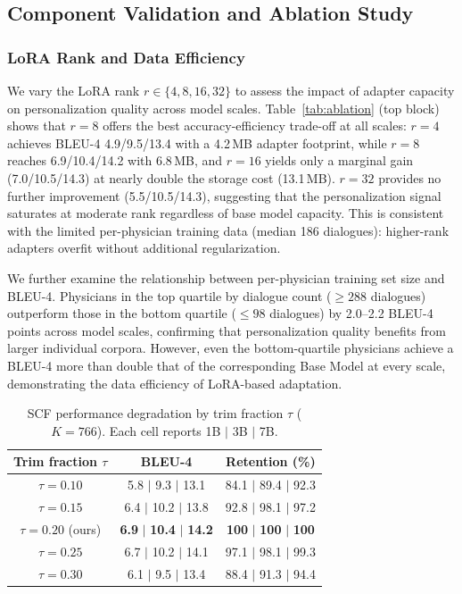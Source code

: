 \subsection{Component Validation and Ablation Study}

\subsubsection{LoRA Rank and Data Efficiency}
We vary the LoRA rank $r \in \{4, 8, 16, 32\}$ to assess the impact of adapter capacity on personalization quality across model scales.
Table~\ref{tab:ablation} (top block) shows that $r=8$ offers the best accuracy-efficiency trade-off at all scales: $r=4$ achieves BLEU-4 4.9/9.5/13.4 with a 4.2\,MB adapter footprint, while $r=8$ reaches 6.9/10.4/14.2 with 6.8\,MB, and $r=16$ yields only a marginal gain (7.0/10.5/14.3) at nearly double the storage cost (13.1\,MB).
$r=32$ provides no further improvement (5.5/10.5/14.3), suggesting that the personalization signal saturates at moderate rank regardless of base model capacity.
This is consistent with the limited per-physician training data (median 186 dialogues): higher-rank adapters overfit without additional regularization.

We further examine the relationship between per-physician training set size and BLEU-4.
Physicians in the top quartile by dialogue count ($\ge 288$ dialogues) outperform those in the bottom quartile ($\le 98$ dialogues) by 2.0--2.2 BLEU-4 points across model scales, confirming that personalization quality benefits from larger individual corpora.
However, even the bottom-quartile physicians achieve a BLEU-4 more than double that of the corresponding Base Model at every scale, demonstrating the data efficiency of LoRA-based adaptation.


\begin{table}[t]
\renewcommand\arraystretch{1.06}
\centering
\caption{SCF performance degradation by trim fraction $\tau$ ($K=766$). Each cell reports 1B $|$ 3B $|$ 7B.}
\label{tab:scf_retention}
\begin{tabular}{c|cc}
\toprule
\textbf{Trim fraction $\tau$} & \textbf{BLEU-4} & \textbf{Retention (\%)} \\
\midrule
$\tau=0.10$ & 5.8 $|$ 9.3 $|$ 13.1 & 84.1 $|$ 89.4 $|$ 92.3 \\
$\tau=0.15$ & 6.4 $|$ 10.2 $|$ 13.8 &  92.8 $|$ 98.1 $|$ 97.2 \\
\rowcolor{blue!5}
$\tau=0.20$ (ours) & \textbf{6.9} $|$ \textbf{10.4} $|$ \textbf{14.2} & \textbf{100} $|$ \textbf{100} $|$ \textbf{100} \\
$\tau=0.25$ & 6.7 $|$ 10.2 $|$ 14.1 & 97.1 $|$ 98.1 $|$ 99.3 \\
$\tau=0.30$ & 6.1 $|$ 9.5 $|$ 13.4 & 88.4 $|$ 91.3 $|$ 94.4 \\
\bottomrule
\end{tabular}
\end{table}

